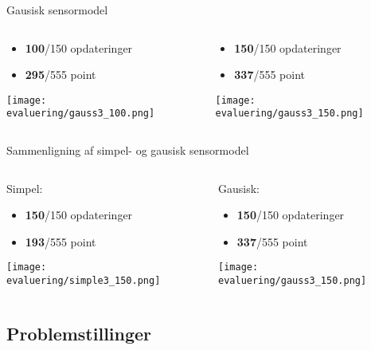\begin{frame}[fragile]{Gausisk sensormodel}
	\begin{columns}
		\begin{column}{0.5\textwidth}
			\begin{itemize}
			\item \textbf{100}/150 opdateringer
			\item \textbf{295}/555 point
			\end{itemize}
			\texttt{[image: evaluering/gauss3\_100.png]}
		\end{column}
		\begin{column}{0.5\textwidth}
			\begin{itemize}
			\item \textbf{150}/150 opdateringer
			\item \textbf{337}/555 point
			\end{itemize}
			\texttt{[image: evaluering/gauss3\_150.png]}
		\end{column}
\end{columns}
\end{frame}

\begin{frame}[fragile]{Sammenligning af simpel- og gausisk sensormodel}
	\begin{columns}
		\begin{column}{0.5\textwidth}
			Simpel:
			\begin{itemize}
			\item \textbf{150}/150 opdateringer
			\item \textbf{193}/555 point
			\end{itemize}
			\texttt{[image: evaluering/simple3\_150.png]}
		\end{column}
		\begin{column}{0.5\textwidth}
			Gausisk:
			\begin{itemize}
			\item \textbf{150}/150 opdateringer
			\item \textbf{337}/555 point
			\end{itemize}
			\texttt{[image: evaluering/gauss3\_150.png]}
		\end{column}
\end{columns}
\end{frame}

\subsection{Problemstillinger}

